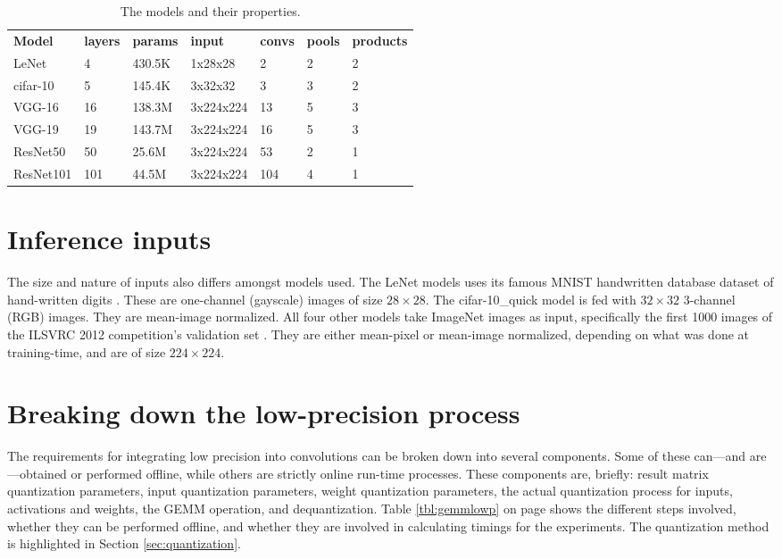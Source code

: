 \begin{table}[]
\centering
\caption[Model properties]{The models and their properties.}
\label{tbl:models}
\begin{tabular}{lllllll}
\textbf{Model}     & \textbf{layers} & \textbf{params} & \textbf{input} & \textbf{convs} & \textbf{pools} & \textbf{products} \\
LeNet     & 4               & 430.5K          & 1x28x28        & 2              & 2              & 2                 \\
cifar-10  & 5               & 145.4K          & 3x32x32        & 3              & 3              & 2                 \\
VGG-16    & 16              & 138.3M          & 3x224x224      & 13             & 5              & 3                 \\
VGG-19    & 19              & 143.7M          & 3x224x224      & 16             & 5              & 3                 \\
ResNet50  & 50              & 25.6M           & 3x224x224      & 53             & 2              & 1                 \\
ResNet101 & 101             & 44.5M           & 3x224x224      & 104            & 4              & 1                
\end{tabular}
\end{table}

\section{Inference inputs}
\label{sec:infinputs}
The size and nature of inputs also differs amongst models used. The LeNet models uses its famous MNIST handwritten database dataset of hand-written digits \cite{mnist}. These are one-channel (gayscale) images of size $28\times28$. The cifar-10\_quick model is fed with $32\times32$ 3-channel (RGB) images. They are mean-image normalized. All four other models take ImageNet images as input, specifically the first 1000 images of the ILSVRC 2012 competition's validation set \cite{imagenet}. They are either mean-pixel or mean-image normalized, depending on what was done at training-time, and are of size $224\times224$.

\section{Breaking down the low-precision process}
The requirements for integrating low precision into convolutions can be broken down into several components. Some of these can---and are---obtained or performed offline, while others are strictly online run-time processes. These components are, briefly: result matrix quantization parameters, input quantization parameters, weight quantization parameters, the actual quantization process for inputs, activations and weights, the GEMM operation, and dequantization. Table \ref{tbl:gemmlowp} on page \pageref{tbl:gemmlowp} shows the different steps involved, whether they can be performed offline, and whether they are involved in calculating timings for the experiments. The quantization method is highlighted in Section \ref{sec:quantization}.


